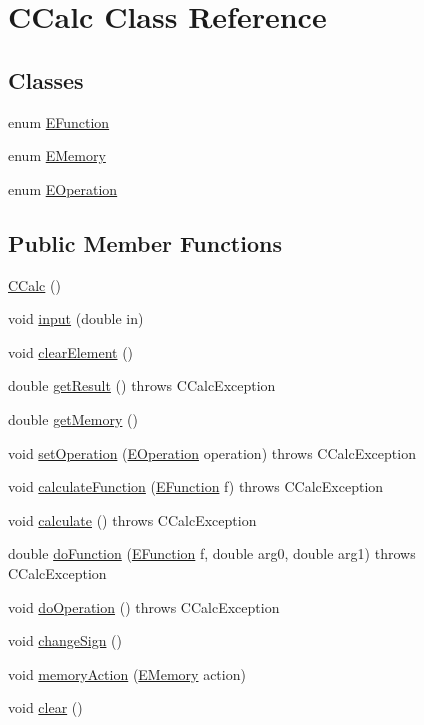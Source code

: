 \hypertarget{class_c_calc}{}\section{C\+Calc Class Reference}
\label{class_c_calc}
\subsection*{Classes}
\begin{DoxyCompactItemize}
\item 
enum \hyperlink{enum_c_calc_1_1_e_function}{E\+Function}
\item 
enum \hyperlink{enum_c_calc_1_1_e_memory}{E\+Memory}
\item 
enum \hyperlink{enum_c_calc_1_1_e_operation}{E\+Operation}
\end{DoxyCompactItemize}
\subsection*{Public Member Functions}
\begin{DoxyCompactItemize}
\item 
\hyperlink{class_c_calc_a808fd222b928bf2839f82d4cf7ec4e28}{C\+Calc} ()
\item 
void \hyperlink{class_c_calc_a5a55e6cd1b183f6565ea7e5b58de97f8}{input} (double in)
\item 
void \hyperlink{class_c_calc_a76bdc622bdcc4e421fd43ed2a0340c55}{clear\+Element} ()
\item 
double \hyperlink{class_c_calc_afb0ca09d370c676a85d455fc7f1560a6}{get\+Result} ()  throws C\+Calc\+Exception 
\item 
double \hyperlink{class_c_calc_a6a737d8a3b0793e255ab689cd3a84588}{get\+Memory} ()
\item 
void \hyperlink{class_c_calc_a046be85fab1b9273ff05d7ad7800dbcf}{set\+Operation} (\hyperlink{enum_c_calc_1_1_e_operation}{E\+Operation} operation)  throws C\+Calc\+Exception 
\item 
void \hyperlink{class_c_calc_af4663f5164ebdaad05e9b4b674d5432f}{calculate\+Function} (\hyperlink{enum_c_calc_1_1_e_function}{E\+Function} f)  throws C\+Calc\+Exception 
\item 
void \hyperlink{class_c_calc_a9960e86f7da4506dcbd80fea556d1228}{calculate} ()  throws C\+Calc\+Exception 
\item 
double \hyperlink{class_c_calc_a3e4d8e44665285900b1217adac076b35}{do\+Function} (\hyperlink{enum_c_calc_1_1_e_function}{E\+Function} f, double arg0, double arg1)  throws C\+Calc\+Exception 
\item 
void \hyperlink{class_c_calc_a3a364db35959788ea22d273c414cb8b5}{do\+Operation} ()  throws C\+Calc\+Exception 
\item 
void \hyperlink{class_c_calc_a0318ad50e854a00e0fc0046c12b966f3}{change\+Sign} ()
\item 
void \hyperlink{class_c_calc_a4dd1f83f0fab295ba4b5cd01890e37c2}{memory\+Action} (\hyperlink{enum_c_calc_1_1_e_memory}{E\+Memory} action)
\item 
void \hyperlink{class_c_calc_ae7cb614698c943a305748e4a9117f2a8}{clear} ()
\end{DoxyCompactItemize}


